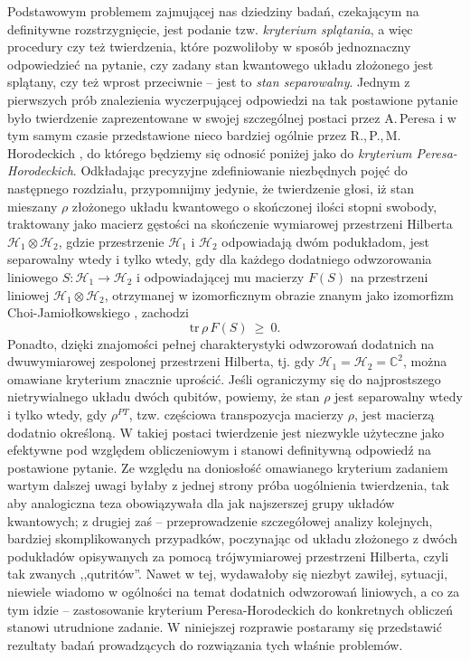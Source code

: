 Podstawowym problemem zajmującej nas dziedziny badań,
czekającym na definitywne rozstrzygnięcie,
jest podanie tzw. \emph{kryterium splątania},
a więc procedury czy też twierdzenia,
które pozwoliłoby w sposób jednoznaczny odpowiedzieć na pytanie,
czy zadany stan kwantowego układu złożonego jest splątany,
czy też wprost przeciwnie -- jest to 
 \emph{stan separowalny}.
Jednym z pierwszych prób znalezienia wyczerpującej odpowiedzi na tak postawione
pytanie było twierdzenie zaprezentowane w swojej szczególnej postaci 
przez A.\,Peresa
\cite{peres1996separability}
i w tym samym czasie przedstawione nieco bardziej ogólnie przez
R.,\,P.,\,M.\,Horodeckich
\cite{horodecki1996separability},
do którego będziemy się odnosić poniżej jako do 
 \emph{kryterium Peresa-Horodeckich}.
Odkładając precyzyjne zdefiniowanie niezbędnych pojęć do następnego rozdziału,
przypomnijmy jedynie, że twierdzenie głosi,
iż stan mieszany $\rho$ złożonego układu kwantowego o skończonej ilości
stopni swobody,
traktowany jako macierz gęstości na skończenie wymiarowej przestrzeni 
Hilberta $\mathcal{H}_{1} \otimes \mathcal{H}_{2}$,
gdzie przestrzenie $\mathcal{H}_{1}$ i $\mathcal{H}_{2}$ odpowiadają dwóm podukładom,
jest separowalny wtedy i tylko wtedy,
gdy dla każdego dodatniego odwzorowania liniowego
$S \!: \mathcal{H}_{1} \rightarrow \mathcal{H}_{2}$
i odpowiadającej mu macierzy $F(S)$ na przestrzeni liniowej
$\mathcal{H}_{1} \otimes \mathcal{H}_{2}$,
otrzymanej w izomorficznym obrazie znanym jako izomorfizm Choi-Jamiołkowskiego
\cite{choi1975completely, jamiolkowski1972linear},
zachodzi
\begin{equation}
    \label{eq:PHcriterionOrig}
    \text{tr} \, \rho \, F(S) \: \geq \: 0.
\end{equation}
Ponadto, dzięki znajomości pełnej charakterystyki odwzorowań dodatnich
na dwuwymiarowej zespolonej przestrzeni Hilberta,
tj. gdy $\mathcal{H}_{1} = \mathcal{H}_{2} = \mathbb{C}^{2}$,
można omawiane kryterium znacznie uprościć.
Jeśli ograniczymy się do najprostszego nietrywialnego układu dwóch qubitów,
powiemy,
że stan $\rho$ jest separowalny wtedy i tylko wtedy,
gdy $\rho^{PT}$, tzw. częściowa transpozycja macierzy $\rho$,
jest macierzą dodatnio określoną.
W takiej postaci twierdzenie jest niezwykle użyteczne jako efektywne pod względem
obliczeniowym i stanowi definitywną odpowiedź na postawione pytanie.
Ze względu na doniosłość omawianego kryterium zadaniem wartym dalszej uwagi
byłaby z jednej strony próba uogólnienia twierdzenia,
tak aby analogiczna teza obowiązywała dla jak najszerszej grupy układów kwantowych;
z drugiej zaś -- przeprowadzenie szczegółowej analizy kolejnych,
bardziej skomplikowanych przypadków,
poczynając od układu złożonego z dwóch podukładów 
opisywanych za pomocą trójwymiarowej przestrzeni Hilberta,
czyli tak zwanych ,,qutritów''.
Nawet w tej,
wydawałoby się niezbyt zawiłej,
sytuacji,
niewiele wiadomo w ogólności na temat dodatnich odwzorowań liniowych,
a co za tym idzie --
zastosowanie kryterium Peresa-Horodeckich do konkretnych obliczeń stanowi utrudnione zadanie.
W niniejszej rozprawie postaramy się przedstawić rezultaty badań prowadzących
do rozwiązania tych właśnie problemów.

